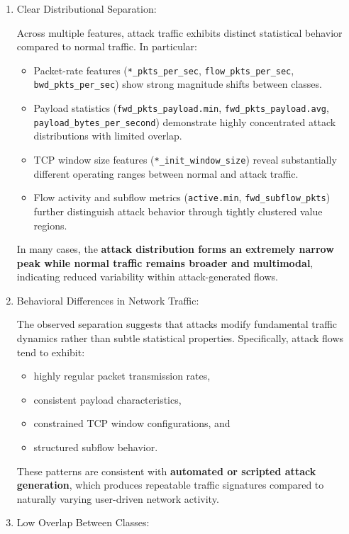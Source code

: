 \documentclass[
  letterpaper,
  DIV=11,
  numbers=noendperiod]{scrartcl}
\providecommand{\tightlist}{%
  \setlength{\itemsep}{0pt}\setlength{\parskip}{0pt}}
\begin{document}
\begin{enumerate}
\def\labelenumi{\arabic{enumi}.}
\item
  Clear Distributional Separation:

  Across multiple features, attack traffic exhibits distinct statistical
  behavior compared to normal traffic. In particular:

  \begin{itemize}
  \tightlist
  \item
    Packet-rate features (\texttt{*\_pkts\_per\_sec},
    \texttt{flow\_pkts\_per\_sec}, \texttt{bwd\_pkts\_per\_sec}) show
    strong magnitude shifts between classes.
  \item
    Payload statistics (\texttt{fwd\_pkts\_payload.min},
    \texttt{fwd\_pkts\_payload.avg},
    \texttt{payload\_bytes\_per\_second}) demonstrate highly
    concentrated attack distributions with limited overlap.
  \item
    TCP window size features (\texttt{*\_init\_window\_size}) reveal
    substantially different operating ranges between normal and attack
    traffic.
  \item
    Flow activity and subflow metrics (\texttt{active.min},
    \texttt{fwd\_subflow\_pkts}) further distinguish attack behavior
    through tightly clustered value regions.
  \end{itemize}

  In many cases, the \textbf{attack distribution forms an extremely
  narrow peak while normal traffic remains broader and multimodal},
  indicating reduced variability within attack-generated flows.
\item
  Behavioral Differences in Network Traffic:

  The observed separation suggests that attacks modify fundamental
  traffic dynamics rather than subtle statistical properties.
  Specifically, attack flows tend to exhibit:

  \begin{itemize}
  \tightlist
  \item
    highly regular packet transmission rates,
  \item
    consistent payload characteristics,
  \item
    constrained TCP window configurations, and
  \item
    structured subflow behavior.
  \end{itemize}

  These patterns are consistent with \textbf{automated or scripted
  attack generation}, which produces repeatable traffic signatures
  compared to naturally varying user-driven network activity.
\item
  Low Overlap Between Classes:


\end{enumerate}
\end{document}
